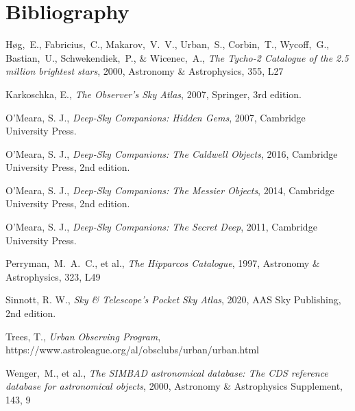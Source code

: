 \chapter*{Bibliography}

Høg,~E., Fabricius,~C., Makarov,~V.~V., Urban,~S., Corbin,~T., Wycoff,~G., Bastian,~U., Schwekendiek,~P., \& Wicenec,~A., \emph{The Tycho-2 Catalogue of the 2.5 million brightest stars}, 2000, Astronomy \& Astrophysics, 355, L27

Karkoschka, E., \emph{The Observer’s Sky Atlas},  2007, Springer, 3rd edition.

O’Meara, S. J., \emph{Deep-Sky Companions: Hidden Gems},  2007, Cambridge University Press.

O’Meara, S. J., \emph{Deep-Sky Companions: The Caldwell Objects},  2016, Cambridge University Press, 2nd edition.

O’Meara, S. J., \emph{Deep-Sky Companions: The Messier Objects},  2014, Cambridge University Press, 2nd edition.

O’Meara, S. J., \emph{Deep-Sky Companions: The Secret Deep},  2011, Cambridge University Press.

Perryman,~M.~A.~C., et al., \emph{The Hipparcos Catalogue}, 1997,  Astronomy \& Astrophysics, 323, L49

Sinnott, R. W., \emph{Sky \& Telescope’s Pocket Sky Atlas}, 2020, AAS Sky Publishing, 2nd edition.

Trees, T., \emph{Urban Observing Program}, \\
https://www.astroleague.org/al/obsclubs/urban/urban.html

Wenger,~M., et al., \emph{The SIMBAD astronomical database: The CDS reference database for astronomical objects}, 2000, Astronomy \& Astrophysics Supplement, 143, 9
